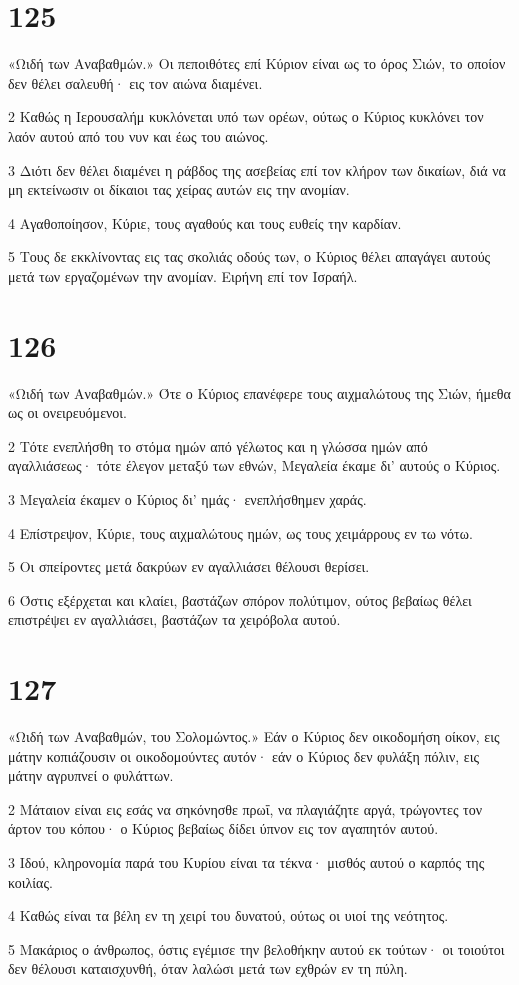 \chapter{125}

\par «Ωιδή των Αναβαθμών.» Οι πεποιθότες επί Κύριον είναι ως το όρος Σιών, το οποίον δεν θέλει σαλευθή· εις τον αιώνα διαμένει.
\par 2 Καθώς η Ιερουσαλήμ κυκλόνεται υπό των ορέων, ούτως ο Κύριος κυκλόνει τον λαόν αυτού από του νυν και έως του αιώνος.
\par 3 Διότι δεν θέλει διαμένει η ράβδος της ασεβείας επί τον κλήρον των δικαίων, διά να μη εκτείνωσιν οι δίκαιοι τας χείρας αυτών εις την ανομίαν.
\par 4 Αγαθοποίησον, Κύριε, τους αγαθούς και τους ευθείς την καρδίαν.
\par 5 Τους δε εκκλίνοντας εις τας σκολιάς οδούς των, ο Κύριος θέλει απαγάγει αυτούς μετά των εργαζομένων την ανομίαν. Ειρήνη επί τον Ισραήλ.

\chapter{126}

\par «Ωιδή των Αναβαθμών.» Ότε ο Κύριος επανέφερε τους αιχμαλώτους της Σιών, ήμεθα ως οι ονειρευόμενοι.
\par 2 Τότε ενεπλήσθη το στόμα ημών από γέλωτος και η γλώσσα ημών από αγαλλιάσεως· τότε έλεγον μεταξύ των εθνών, Μεγαλεία έκαμε δι' αυτούς ο Κύριος.
\par 3 Μεγαλεία έκαμεν ο Κύριος δι' ημάς· ενεπλήσθημεν χαράς.
\par 4 Επίστρεψον, Κύριε, τους αιχμαλώτους ημών, ως τους χειμάρρους εν τω νότω.
\par 5 Οι σπείροντες μετά δακρύων εν αγαλλιάσει θέλουσι θερίσει.
\par 6 Όστις εξέρχεται και κλαίει, βαστάζων σπόρον πολύτιμον, ούτος βεβαίως θέλει επιστρέψει εν αγαλλιάσει, βαστάζων τα χειρόβολα αυτού.

\chapter{127}

\par «Ωιδή των Αναβαθμών, του Σολομώντος.» Εάν ο Κύριος δεν οικοδομήση οίκον, εις μάτην κοπιάζουσιν οι οικοδομούντες αυτόν· εάν ο Κύριος δεν φυλάξη πόλιν, εις μάτην αγρυπνεί ο φυλάττων.
\par 2 Μάταιον είναι εις εσάς να σηκόνησθε πρωΐ, να πλαγιάζητε αργά, τρώγοντες τον άρτον του κόπου· ο Κύριος βεβαίως δίδει ύπνον εις τον αγαπητόν αυτού.
\par 3 Ιδού, κληρονομία παρά του Κυρίου είναι τα τέκνα· μισθός αυτού ο καρπός της κοιλίας.
\par 4 Καθώς είναι τα βέλη εν τη χειρί του δυνατού, ούτως οι υιοί της νεότητος.
\par 5 Μακάριος ο άνθρωπος, όστις εγέμισε την βελοθήκην αυτού εκ τούτων· οι τοιούτοι δεν θέλουσι καταισχυνθή, όταν λαλώσι μετά των εχθρών εν τη πύλη.

